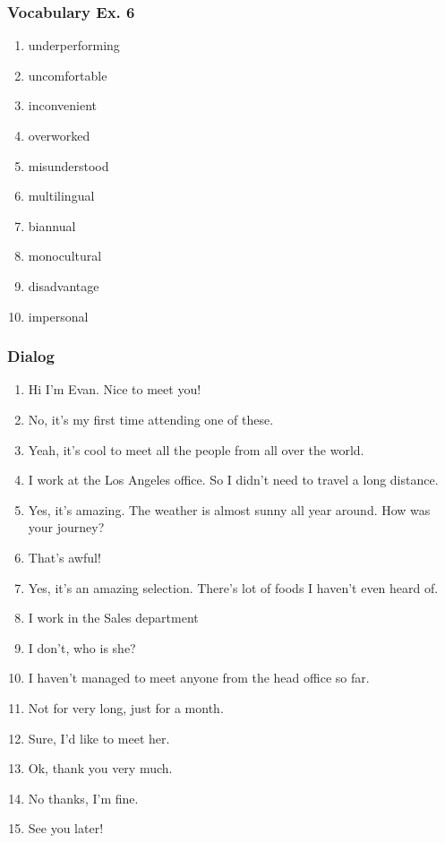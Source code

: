 \documentclass[12pt, a4paper, oneside]{article}
\begin{document}
  \subsubsection{Vocabulary Ex. 6}
  \begin{enumerate}[1.]
    \item underperforming
    \item uncomfortable
    \item inconvenient
    \item overworked
    \item misunderstood
    \item multilingual
    \item biannual
    \item monocultural
    \item disadvantage
    \item impersonal
  \end{enumerate}

  \subsubsection{Dialog}
  \begin{enumerate}[1.]
    \item Hi I'm Evan. Nice to meet you!
    \item No, it's my first time attending one of these.
    \item Yeah, it's cool to meet all the people from all over the world.
    \item I work at the Los Angeles office. So I didn't need to travel a long distance.
    \item Yes, it's amazing. The weather is almost sunny all year around. How was your journey?
    \item That's awful!
    \item Yes, it's an amazing selection. There's lot of foods I haven't even heard of.
    \item I work in the Sales department
    \item I don't, who is she?
    \item I haven't managed to meet anyone from the head office so far.
    \item Not for very long, just for a month.
    \item Sure, I'd like to meet her.
    \item Ok, thank you very much.
    \item No thanks, I'm fine.
    \item See you later!

  \end{enumerate}
\end{document}

